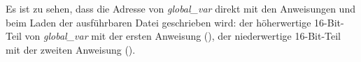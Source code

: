 Es ist zu sehen, dass die Adresse von \emph{global\_var} direkt mit den Anweisungen
 und  beim Laden der ausführbaren Datei geschrieben wird:
der höherwertige 16-Bit-Teil von \emph{global\_var} mit der ersten Anweisung (),
der niederwertige 16-Bit-Teil mit der zweiten Anweisung ().
